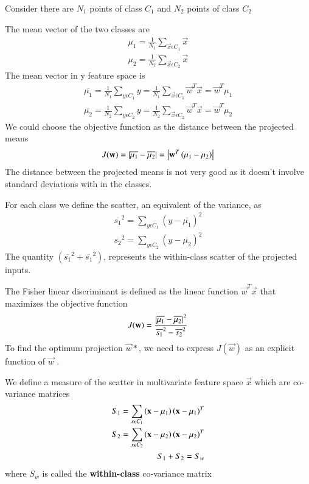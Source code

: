 \documentclass[journal,12pt,twocolumn]{IEEEtran}
\begin{document}
Consider there are $N_{1}$ points of class $C_{1}$ and $N_{2}$ points of class $C_{2}$

The mean vector of the two classes are
\begin{align}
      \mu_{1} = \frac{1}{N_{1}} \sum_{\vec{x} \epsilon C_{1}} \vec{x}\\
      \mu_{2} = \frac{1}{N_{2}} \sum_{\vec{x} \epsilon C_{2}} \vec{x}
\end{align}
The mean vector in y feature space is
\begin{align}
    \overline{\mu_{1}} = \frac{1}{N_{1}} \sum_{y \epsilon C_{1}} y = \frac{1}{N_{1}} \sum_{\vec{x} \epsilon C_{1}} \vec{w}^T\vec{x} = \vec{w}^{T}\mu_{1}\label{eq : mean}\\
    \overline{\mu_{2}} = \frac{1}{N_{2}} \sum_{y \epsilon C_{2}} y = \frac{1}{N_{2}} \sum_{\vec{x} \epsilon C_{2}} \vec{w}^T\vec{x} = \vec{w}^{T}\mu_{2}
\end{align}
We could choose the objective function as the distance between the projected means
\begin{align}
    J(\mathbf{w}) = \left\vert\overline{\mu_{1}} - \overline{\mu_{2}}\right\vert =\left\vert \mathbf{w}^{T}\left(\mu_{1} - \mu_{2}\right)\right\vert
\end{align}
The distance between the projected means is not very good as it doesn't involve standard deviations with in the classes.

For each class we define the scatter, an equivalent of the variance, as
\begin{align}
    \overline{s_{1}}^2 = \sum_{y \epsilon C_{1}} (y - \overline{\mu_{1}})^2\\
    \overline{s_{2}}^2 = \sum_{y \epsilon C_{2}} (y - \overline{\mu_{2}})^2 \label{eq : within_class_scatter}
\end{align}
The quantity $(\overline{s_{1}}^2 + \overline{s_{1}}^2)$, represents the within-class scatter of the projected inputs.

The Fisher linear discriminant is defined as the linear function $\vec{w}^{T}\vec{x}$ that maximizes the objective function
\begin{align}
    J(\mathbf{w}) = \frac{\left\vert\overline{\mu_{1}} - \overline{\mu_{2}}\right\vert^2}{\overline{s_{1}}^2 - \overline{s_{2}}^2}
\end{align}
To find the optimum projection $\vec{w}*$, we need to express $J(\vec{w})$ as an explicit function of $\vec{w}$ .

We define a measure of the scatter in multivariate feature space $\vec{x}$ which are co-variance matrices
\begin{align}
    S_{1} = \sum_{x \epsilon C_{1}}\left(\mathbf{x} - \mu_{1}\right)\left(\mathbf{x} - \mu_{1}\right)^{T}\\
    S_{2} = \sum_{x \epsilon C_{2}}\left(\mathbf{x} - \mu_{2}\right)\left(\mathbf{x} - \mu_{2}\right)^{T}\\
    S_{1} + S_{2} = S_{w}
\end{align}
where $S_{w}$ is called the \textbf{within-class} co-variance matrix
\end{document}
